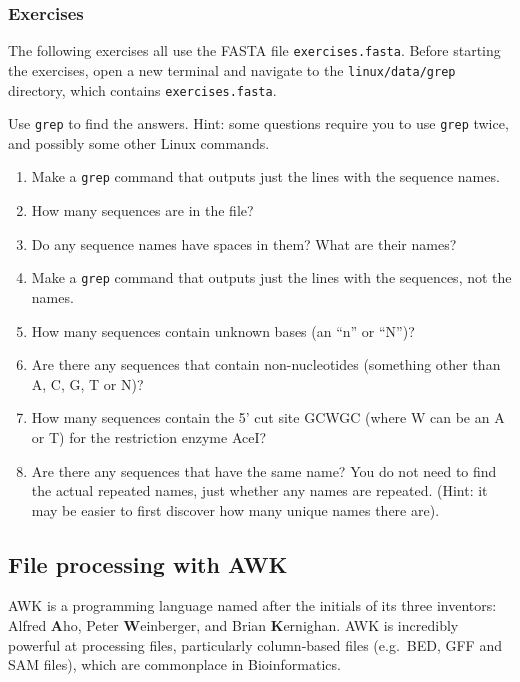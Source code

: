 \documentclass[11pt]{article}
\providecommand{\tightlist}{%
      \setlength{\itemsep}{0pt}\setlength{\parskip}{0pt}}
\begin{document}
    \hypertarget{exercises}{%
\subsubsection{Exercises}\label{exercises}}

The following exercises all use the FASTA file \texttt{exercises.fasta}.
Before starting the exercises, open a new terminal and navigate to the
\texttt{linux/data/grep} directory, which contains
\texttt{exercises.fasta}.

Use \texttt{grep} to find the answers. Hint: some questions require you
to use \texttt{grep} twice, and possibly some other Linux commands.

\begin{enumerate}
\def\labelenumi{\arabic{enumi}.}
\tightlist
\item
  Make a \texttt{grep} command that outputs just the lines with the
  sequence names.
\item
  How many sequences are in the file?
\item
  Do any sequence names have spaces in them? What are their names?
\item
  Make a \texttt{grep} command that outputs just the lines with the
  sequences, not the names.
\item
  How many sequences contain unknown bases (an ``n'' or ``N'')?
\item
  Are there any sequences that contain non-nucleotides (something other
  than A, C, G, T or N)?
\item
  How many sequences contain the 5' cut site GCWGC (where W can be an A
  or T) for the restriction enzyme AceI?
\item
  Are there any sequences that have the same name? You do not need to
  find the actual repeated names, just whether any names are repeated.
  (Hint: it may be easier to first discover how many unique names there
  are).
\end{enumerate}

    \hypertarget{file-processing-with-awk}{%
\subsection{File processing with AWK}\label{file-processing-with-awk}}

AWK is a programming language named after the initials of its three
inventors: Alfred \textbf{A}ho, Peter \textbf{W}einberger, and Brian
\textbf{K}ernighan. AWK is incredibly powerful at processing files,
particularly column-based files (e.g.~BED, GFF and SAM files), which are
commonplace in Bioinformatics.
\end{document}
